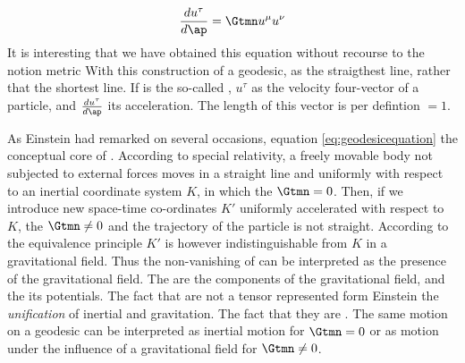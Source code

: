 {%

 
\begin{equation*}\label{eq:geodesicequation}
\frac{d {u^\tau}}{d\ap} = \Gtmn u^{\mu} u^\nu
\end{equation*}
%
It is interesting that we have obtained this equation without recourse to the notion metric With this construction of a geodesic, as the straigthest line, rather that the shortest line. If \ap is the so-called , $u^\tau$ as the velocity four-vector of a particle, and $\frac{d {u^\tau}}{d\ap}$ its acceleration. The length of this vector is per defintion $=1$. 

As Einstein had remarked on several occasions, equation \cref{eq:geodesicequation} the conceptual core of \tr. According to special relativity, a freely movable body not subjected to external forces moves in a straight line and uniformly with respect to an inertial coordinate system $K$, in which the $\Gtmn=0$. Then, if we introduce new space-time co-ordinates $K'$ uniformly accelerated with respect to $K$, the $\Gtmn\neq 0$ and the trajectory of the particle is not straight. According to the equivalence principle $K'$ is however indistinguishable from $K$ in a gravitational field. Thus the non-vanishing of \Gtmn can be interpreted as the presence of the gravitational field. The \Gtmn are the components of the gravitational field, and the \gmn its potentials. The fact that \Gtmn are not a tensor represented form Einstein the \emph{unification} of inertial and gravitation. The fact that they are . The same motion on a geodesic can be interpreted as inertial motion for $\Gtmn=0$ or as motion under the influence of a gravitational field for $\Gtmn \neq 0$.



}
